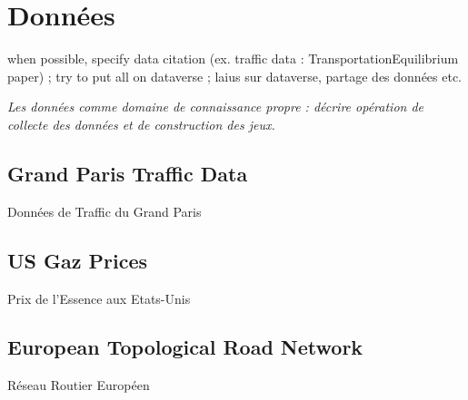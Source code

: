 \chapter{Données}



\label{app:data} %



\headercit{}{}{}




when possible, specify data citation (ex. traffic data : TransportationEquilibrium paper) ; try to put all on dataverse ; laius sur dataverse, partage des données etc.

\textit{Les données comme domaine de connaissance propre : décrire opération de collecte des données et de construction des jeux.}

\section{Grand Paris Traffic Data}{Données de Traffic du Grand Paris}





\section{US Gaz Prices}{Prix de l'Essence aux Etats-Unis}




\section{European Topological Road Network}{Réseau Routier Européen}






